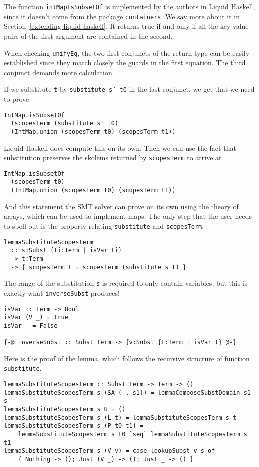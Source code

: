 \documentclass[sigconf, anonymous, review]{acmart}
\newcommand{\tc}[1]{{\small\texttt{#1}}}
\begin{document}
The function \tc{intMapIsSubsetOf} is implemented by the authors in Liquid
Haskell, since it doesn't come from the package \tc{containers}. We say more
about it in Section~\ref{extending-liquid-haskell}. It returns
true if and only if all the key-value pairs of the first argument are contained
in the second.

When checking \tc{unifyEq}, the two first conjuncts of the return type can
be easily established since they match closely the guards in the first equation.
The third conjunct demands more calculation.

If we substitute \tc{t} by \tc{substitute s' t0} in the last conjunct, we get that we
need to prove

\begin{verbatim}
IntMap.isSubsetOf
  (scopesTerm (substitute s' t0)
  (IntMap.union (scopesTerm t0) (scopesTerm t1))
\end{verbatim}

Liquid Haskell does compute this on its own. Then we can use the fact that substitution
preserves the skolems returned by \tc{scopesTerm} to arrive at

\begin{verbatim}
IntMap.isSubsetOf
  (scopesTerm t0)
  (IntMap.union (scopesTerm t0) (scopesTerm t1))
\end{verbatim}

And this statement the SMT solver can prove on its own using the theory of arrays,
which can be used to implement maps. The only step that the user needs to spell out
is the property relating \tc{substitute} and \tc{scopesTerm}.

\begin{verbatim}
lemmaSubstituteScopesTerm
  :: s:Subst {ti:Term | isVar ti}
  -> t:Term
  -> { scopesTerm t = scopesTerm (substitute s t) }
\end{verbatim}

The range of the substitution \tc{s} is required to only contain variables, but
this is exactly what \tc{inverseSubst} produces!

\begin{verbatim}
isVar :: Term -> Bool
isVar (V _) = True
isVar _ = False

{-@ inverseSubst :: Subst Term -> {v:Subst {t:Term | isVar t} @-}
\end{verbatim}

Here is the proof of the lemma, which follows the recursive structure
of function \tc{substitute}.

\begin{verbatim}
lemmaSubstituteScopesTerm :: Subst Term -> Term -> ()
lemmaSubstituteScopesTerm s (SA (_, s1)) = lemmaComposeSubstDomain s1 s
lemmaSubstituteScopesTerm s U = ()
lemmaSubstituteScopesTerm s (L t) = lemmaSubstituteScopesTerm s t
lemmaSubstituteScopesTerm s (P t0 t1) =
    lemmaSubstituteScopesTerm s t0 `seq` lemmaSubstituteScopesTerm s t1
lemmaSubstituteScopesTerm s (V v) = case lookupSubst v s of
    { Nothing -> (); Just (V _) -> (); Just _ -> () }
\end{verbatim}
\end{document}
